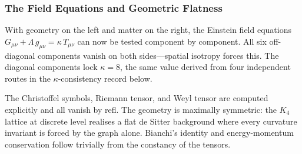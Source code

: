 \documentclass[11pt,a4paper]{book}
\def\texttt#1{#1}%
\begin{document}
\subsubsection*{The Field Equations and Geometric Flatness}

With geometry on the left and matter on the right, the Einstein field
equations $G_{\mu\nu} + \Lambda\,g_{\mu\nu} = \kappa\,T_{\mu\nu}$
can now be tested component by component. All six off-diagonal
components vanish on both sides---spatial isotropy forces this. The
diagonal components lock $\kappa = 8$, the same value derived from
four independent routes in the $\kappa$-consistency record below.

The Christoffel symbols, Riemann tensor, and Weyl tensor are computed
explicitly and all vanish by \texttt{refl}. The geometry is
maximally symmetric: the $K_4$ lattice at discrete level realises a
flat de Sitter background where every curvature invariant is forced
by the graph alone. Bianchi's identity and energy-momentum
conservation follow trivially from the constancy of the tensors.
\end{document}
